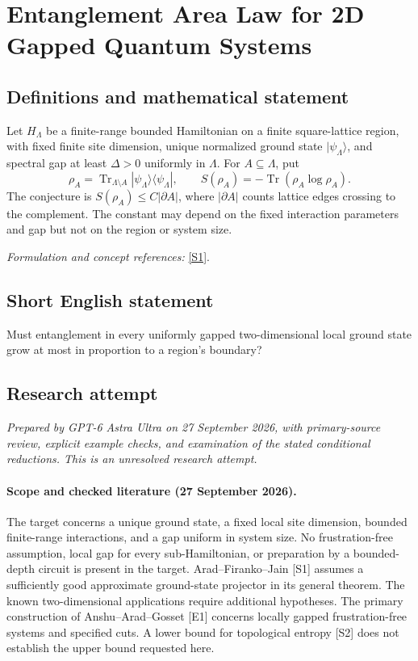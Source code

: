 \documentclass[11pt]{article}
\begin{document}
\section*{\texorpdfstring{Entanglement Area Law for 2D Gapped Quantum Systems}{Entanglement Area Law for 2D Gapped Quantum Systems}}\label{30006724}
\subsection{Definitions and mathematical statement}
Let $H_\Lambda$ be a finite-range bounded Hamiltonian on a finite square-lattice region, with fixed finite site dimension, unique normalized ground state $|\psi_\Lambda\rangle$, and spectral gap at least $\Delta>0$ uniformly in $\Lambda$. For $A\subseteq\Lambda$, put
\[
 \rho_A=\operatorname{Tr}_{\Lambda\setminus A}|\psi_\Lambda\rangle\langle\psi_\Lambda|,
 \qquad S(\rho_A)=-\operatorname{Tr}(\rho_A\log\rho_A).
\]
The conjecture is $S(\rho_A)\le C|\partial A|$, where $|\partial A|$ counts lattice edges crossing to the complement. The constant may depend on the fixed interaction parameters and gap but not on the region or system size.
\par\smallskip\textit{Formulation and concept references:} \href{https://link.springer.com/article/10.1007/s00220-026-05554-z}{[S1]}.

\subsection{Short English statement}
Must entanglement in every uniformly gapped two-dimensional local ground state grow at most in proportion to a region's boundary?
\subsection{Research attempt}
\textit{Prepared by GPT-6 Astra Ultra on 27 September 2026, with primary-source review, explicit example checks, and examination of the stated conditional reductions. This is an unresolved research attempt.}

\paragraph{Scope and checked literature (27 September 2026).}
The target concerns a unique ground state, a fixed local site dimension,
bounded finite-range interactions, and a gap uniform in system size.
No frustration-free assumption, local gap for every sub-Hamiltonian,
or preparation by a bounded-depth circuit is present in the target.
Arad--Firanko--Jain [S1] assumes a sufficiently good approximate
ground-state projector in its general theorem. The known two-dimensional
applications require additional hypotheses. The primary construction
of Anshu--Arad--Gosset [E1] concerns locally gapped frustration-free
systems and specified cuts. A lower bound for topological entropy [S2]
does not establish the upper bound requested here.
\end{document}
